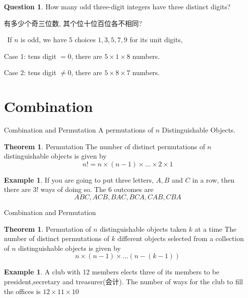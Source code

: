 \documentclass{beamer}
\theoremstyle{definition}
\newtheorem{theo}[defn]{Theorem}
\newtheorem{exam}[defn]{Example}
\newtheorem{ques}[defn]{Question}
\newenvironment{prooff}{{\noindent\it\textcolor{cyan!40!black}{Proof}:}\,}{\par}
\begin{document}
\begin{frame}
    \begin{ques}
        How many odd three-digit integers have three distinct digits?

        有多少个奇三位数, 其个位十位百位各不相同?
        \pause
    \end{ques}
    \begin{prooff}
        If $n$ is odd, we have $5$ choices $1,3,5,7,9$ for its unit digits,

        Case 1: tens digit $=0$, there are $5\times 1\times 8$ numbers.

        Case 2: tens digit $\neq 0$, there are $5\times 8 \times 7$ numbers.
    \end{prooff}
\end{frame}
\section{Combination}
\begin{frame}{Combination and Permutation}
    A permutations of $n$ Distinguishable Objects.
    \begin{theo}{Permutation}
        The number of distinct permutations of $n$ distinguishable objects is given by
        \begin{equation*}
            n!=n\times (n-1)\times \dots \times 2\times 1
        \end{equation*}
    \end{theo}
    \begin{exam}
        If you are going to put three letters, $A,B$ and $C$ in a row, then there are $3!$ ways of doing so.
        The $6$ outcomes are
        \begin{equation*}
            ABC,ACB,BAC,BCA,CAB,CBA
        \end{equation*}
    \end{exam}
\end{frame}
\begin{frame}{Combination and Permutation}
    \begin{theo}{Permutation  of $n$ distinguishable objects taken $k$ at a time}
        The number of distinct permutations of $k$ different objects selected from a collection of $n$ distinguishable objects is given by
        \begin{equation*}
            n\times (n-1)\times\dots (n-(k-1))
        \end{equation*}
    \end{theo}
    \begin{exam}
        A club with 12 members elects three of its members to be president,secretary and
        treasurer(会计). The number of ways for the club to fill the offices is $12\times 11\times 10$
    \end{exam}
\end{frame}
\end{document}
